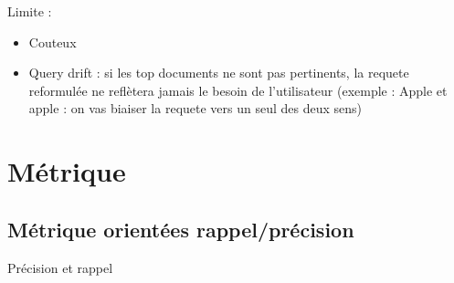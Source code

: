 \documentclass{article}
\theoremstyle{plain}%
\theoremstyle{definition}
\theoremstyle{remark}
\begin{document}
Limite : 
\begin{itemize}
    \item Couteux
    \item Query drift : si les top documents ne sont pas pertinents, la requete reformulée ne reflètera jamais le besoin de l'utilisateur (exemple : Apple et apple :  on vas biaiser la requete vers un seul des deux sens)
\end{itemize}

\section{Métrique}
\subsection{Métrique orientées rappel/précision}
Précision et rappel
\end{document}
